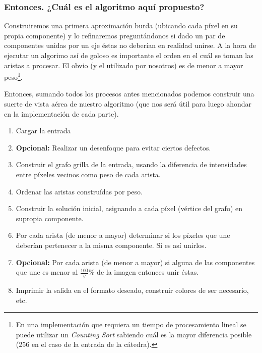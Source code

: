 \subsubsection{Entonces. ¿Cuál es el algoritmo aquí propuesto?}

Construiremos una primera aproximación burda (ubicando cada píxel en su propia
componente) y lo refinaremos preguntándonos si dado un par de componentes
unidas por un eje éstas no deberían en realidad unirse. A la hora de ejecutar
un algorimo así de goloso es importante el orden en el cuál se toman las
aristas a procesar. El obvio (y el utilizado por nosotros) es de menor a mayor
peso\footnote{En una implementación que requiera un tiempo de procesamiento
lineal se puede utilizar un \emph{Counting Sort} sabiendo cuál es la mayor
diferencia posible (256 en el caso de la entrada de la cátedra).}.

Entonces, sumando todos los procesos antes mencionados podemos construir una
suerte de vista aérea de nuestro algoritmo (que nos será útil para luego
ahondar en la implementación de cada parte).

\begin{enumerate}
	\item Cargar la entrada
	\item \textbf{Opcional:} Realizar un desenfoque para evitar
	      ciertos defectos.
	\item Construir el grafo grilla de la entrada, usando la diferencia
	      de intensidades entre píxeles vecinos como peso de cada arista.
	\item Ordenar las aristas construídas por peso.
	\item Construir la solución inicial, asignando a cada píxel (vértice
	      del grafo) en supropia componente.
	\item Por cada arista (de menor a mayor) determinar si los píxeles que
	      une deberían pertenecer a la misma componente. Si es así unirlos.
	\item \textbf{Opcional:} Por cada arista (de menor a mayor) si alguna
	      de las componentes que une es menor al $\frac{100}{g}\%$ de la
	      imagen entonces unir éstas.
	\item Imprimir la salida en el formato deseado, construir colores de
	      ser necesario, etc.
\end{enumerate}
